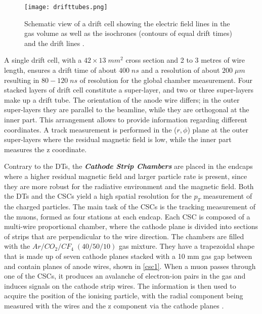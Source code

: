 \begin{figure}[ht]
	\centering
	\texttt{[image: drifttubes.png]}
	\vspace{2mm}
	\caption[Schematic view of a drift cell showing the electric field lines in the gas volume as well as the isochrones (contours of equal drift times) and the drift lines.]{Schematic view of a drift cell showing the electric field lines in the gas volume as well as the isochrones (contours of equal drift times) and the drift lines \cite{Abbiendi:2705998}.}
	\label{drifttubes}
\end{figure}

A single drift cell, with a $42 \times 13\; mm^2$ cross section and 2 to 3 metres of wire length, ensures a drift time of about $400\; ns$ and a resolution of about $200\;\mu m$ resulting in $80-120\;ns$ of resolution for the global chamber measurement. Four stacked layers of drift cell constitute a super-layer, and two or three super-layers make up a drift tube. The orientation of the anode wire differs; in the outer super-layers they are parallel to the beamline, while they are orthogonal at the inner part. This arrangement allows to provide information regarding different coordinates. A track measurement is performed in the ($r, \phi$) plane at the outer super-layers where the residual magnetic field is low, while the inner part measures the z coordinate.

Contrary to the DTs, the \emph{\textbf{Cathode Strip Chambers}} are placed in the endcaps where a higher residual magnetic field and larger particle rate is present, since they are more robust for the radiative environment and the magnetic field. Both the DTs and the CSCs yield a high spatial resolution for the $p_T$ measurement of the charged particles. The main task of the CSCs is the tracking measurement of the muons, formed as four stations at each endcap. Each CSC is composed of a multi-wire proportional chamber, where the cathode plane is divided into sections of strips that are perpendicular to the wire direction. The chambers are filled with the $Ar/CO_2/CF_4\;(40/50/10)$ gas mixture. They have a trapezoidal shape that is made up of seven cathode planes stacked with a 10 mm gas gap between and contain planes of anode wires, shown in \autoref{csc1}. When a muon passes through one of the CSCs, it produces an avalanche of electron-ion pairs in the gas and induces signals on the cathode strip wires. The information is then used to acquire the position of the ionising particle, with the radial component being measured with the wires and the z component via the cathode planes \cite{Sirunyan_2018}.

